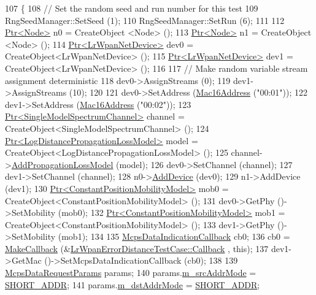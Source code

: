 \begin{DoxyCode}
107 \{
108   \textcolor{comment}{// Set the random seed and run number for this test}
109   RngSeedManager::SetSeed (1);
110   RngSeedManager::SetRun (6);
111 
112   \hyperlink{classns3_1_1Ptr}{Ptr<Node>} n0 = CreateObject <Node> ();
113   \hyperlink{classns3_1_1Ptr}{Ptr<Node>} n1 = CreateObject <Node> ();
114   \hyperlink{classns3_1_1Ptr}{Ptr<LrWpanNetDevice>} dev0 = CreateObject<LrWpanNetDevice> ();
115   \hyperlink{classns3_1_1Ptr}{Ptr<LrWpanNetDevice>} dev1 = CreateObject<LrWpanNetDevice> ();
116 
117   \textcolor{comment}{// Make random variable stream assignment deterministic}
118   dev0->AssignStreams (0);
119   dev1->AssignStreams (10);
120 
121   dev0->SetAddress (\hyperlink{classns3_1_1Mac16Address}{Mac16Address} (\textcolor{stringliteral}{"00:01"}));
122   dev1->SetAddress (\hyperlink{classns3_1_1Mac16Address}{Mac16Address} (\textcolor{stringliteral}{"00:02"}));
123   \hyperlink{classns3_1_1Ptr}{Ptr<SingleModelSpectrumChannel>} channel = 
      CreateObject<SingleModelSpectrumChannel> ();
124   \hyperlink{classns3_1_1Ptr}{Ptr<LogDistancePropagationLossModel>} model = 
      CreateObject<LogDistancePropagationLossModel> ();
125   channel->\hyperlink{classns3_1_1SingleModelSpectrumChannel_a3d8c68e54e0e7659fdf715260d5613ac}{AddPropagationLossModel} (model);
126   dev0->SetChannel (channel);
127   dev1->SetChannel (channel);
128   n0->\hyperlink{classns3_1_1Node_a42ff83ee1d5d1649c770d3f5b62375de}{AddDevice} (dev0);
129   n1->AddDevice (dev1);
130   \hyperlink{classns3_1_1Ptr}{Ptr<ConstantPositionMobilityModel>} mob0 = 
      CreateObject<ConstantPositionMobilityModel> ();
131   dev0->GetPhy ()->SetMobility (mob0);
132   \hyperlink{classns3_1_1Ptr}{Ptr<ConstantPositionMobilityModel>} mob1 = 
      CreateObject<ConstantPositionMobilityModel> ();
133   dev1->GetPhy ()->SetMobility (mob1);
134 
135   \hyperlink{classns3_1_1Callback}{McpsDataIndicationCallback} cb0;
136   cb0 = \hyperlink{group__makecallbackmemptr_ga9376283685aa99d204048d6a4b7610a4}{MakeCallback} (&\hyperlink{classLrWpanErrorDistanceTestCase_a0d940a7a4e02c258c1c9613b8b791907}{LrWpanErrorDistanceTestCase::Callback}
      , \textcolor{keyword}{this});
137   dev1->GetMac ()->SetMcpsDataIndicationCallback (cb0);
138 
139   \hyperlink{structns3_1_1McpsDataRequestParams}{McpsDataRequestParams} params;
140   params.\hyperlink{structns3_1_1McpsDataRequestParams_a31f4c281d07cf3b5992d45416bd71309}{m\_srcAddrMode} = \hyperlink{group__lr-wpan_gga9ea4702ab11d5329e1593afebce06bbba7bf58267dde39bdabfeeb5793450c5e3}{SHORT\_ADDR};
141   params.\hyperlink{structns3_1_1McpsDataRequestParams_a5c5e8dd4d08bfcd24de430d38ea7cd78}{m\_dstAddrMode} = \hyperlink{group__lr-wpan_gga9ea4702ab11d5329e1593afebce06bbba7bf58267dde39bdabfeeb5793450c5e3}{SHORT\_ADDR};

\end{DoxyCode}
